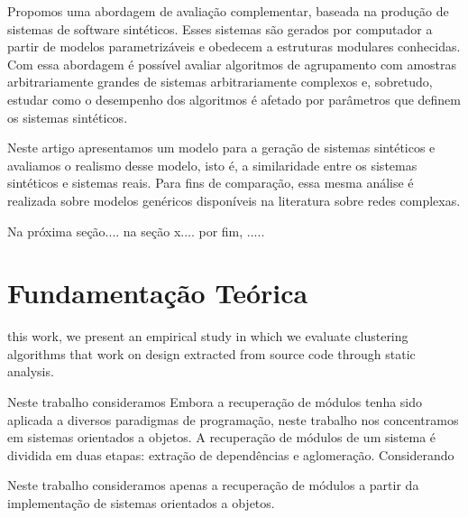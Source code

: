 \documentclass{acm_proc_article-sp}
\begin{document}

Propomos uma abordagem de avaliação complementar, baseada na produção de sistemas de software sintéticos. Esses sistemas são gerados por computador a partir de modelos parametrizáveis e obedecem a estruturas modulares conhecidas. Com essa abordagem é possível avaliar algoritmos de agrupamento com amostras arbitrariamente grandes de sistemas arbitrariamente complexos e, sobretudo, estudar como o desempenho dos algoritmos é afetado por parâmetros que definem os sistemas sintéticos.

Neste artigo apresentamos um modelo para a geração de sistemas sintéticos e avaliamos o realismo desse modelo, isto é, a similaridade entre os sistemas sintéticos e sistemas reais. Para fins de comparação, essa mesma análise é realizada sobre modelos genéricos disponíveis na literatura sobre redes complexas.

Na próxima seção.... na seção x.... por fim, .....

\section{Fundamentação Teórica}

      this work, we present an empirical study in which
we evaluate clustering algorithms that work on design
extracted from source code through static analysis.


Neste trabalho consideramos 
Embora a recuperação de módulos tenha sido aplicada a diversos paradigmas de programação, neste trabalho nos concentramos em sistemas orientados a objetos.
A recuperação de módulos de um sistema é dividida em duas etapas: extração de dependências e aglomeração. Considerando 

Neste trabalho consideramos apenas a recuperação de módulos a partir da implementação de sistemas orientados a objetos. 
\end{document}
